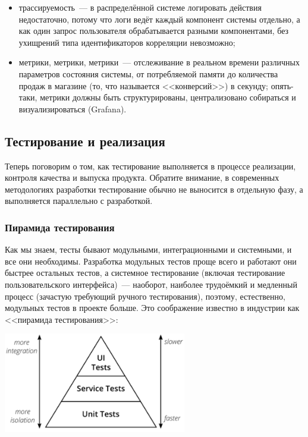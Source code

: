 \documentclass{../../text-style}
\begin{document}
\begin{itemize}
\begin{itemize}
        \item трассируемость~--- в распределённой системе логировать действия недостаточно, потому что логи ведёт каждый компонент системы отдельно, а как один запрос пользователя обрабатывается разными компонентами, без ухищрений типа идентификаторов корреляции невозможно;
        \item метрики, метрики, метрики~--- отслеживание в реальном времени различных параметров состояния системы, от потребляемой памяти до количества продаж в магазине (то, что называется <<конверсий>>) в секунду; опять-таки, метрики должны быть структурированы, централизовано собираться и визуализироваться (Grafana).
    \end{itemize}
\end{itemize}

\subsection{Тестирование и реализация}

Теперь поговорим о том, как тестирование выполняется в процессе реализации, контроля качества и выпуска продукта. Обратите внимание, в современных методологиях разработки тестирование обычно не выносится в отдельную фазу, а выполняется параллельно с разработкой.

\subsubsection{Пирамида тестирования}

Как мы знаем, тесты бывают модульными, интеграционными и системными, и все они необходимы. Разработка модульных тестов проще всего и работают они быстрее остальных тестов, а системное тестирование (включая тестирование пользовательского интерфейса)~--- наоборот, наиболее трудоёмкий и медленный процесс (зачастую требующий ручного тестирования), поэтому, естественно, модульных тестов в проекте больше. Это соображение известно в индустрии как <<пирамида тестирования>>:

\begin{center}
    \includegraphics[width=0.6\textwidth]{testPyramid.png}
\end{center}
\end{document}
